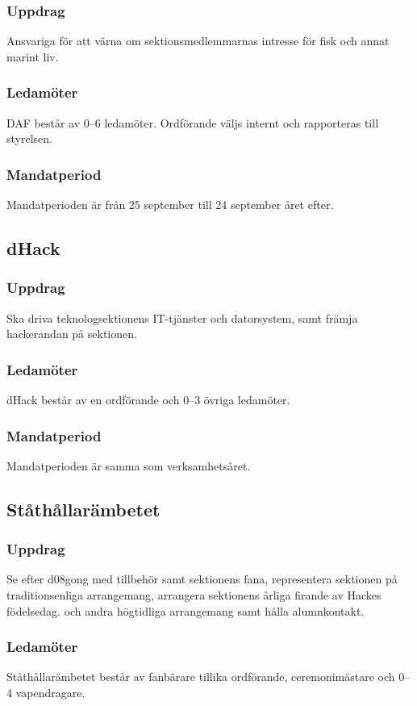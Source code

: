 \subsubsection{Uppdrag}
Ansvariga för att värna om sektionsmedlemmarnas intresse för fisk och
annat marint liv.
\subsubsection{Ledamöter}
DAF består av 0--6 ledamöter. Ordförande väljs internt och rapporteras till styrelsen.
\subsubsection{Mandatperiod}
Mandatperioden är från 25 september till 24 september året efter.

\subsection{dHack}
\subsubsection{Uppdrag}
Ska driva teknologsektionens IT-tjänster och datorsystem, samt
främja hackerandan på sektionen.
\subsubsection{Ledamöter}
dHack består av en ordförande och 0--3 övriga ledamöter.
\subsubsection{Mandatperiod}
Mandatperioden är samma som verksamhetsåret.

\subsection{Ståthållarämbetet}
\subsubsection{Uppdrag}
Se efter d08gong med tillbehör samt sektionens fana, representera sektionen på traditionsenliga arrangemang, arrangera sektionens årliga firande av Hackes födelsedag.
och andra högtidliga arrangemang samt hålla alumnkontakt.
\subsubsection{Ledamöter}
  Ståthållarämbetet består av fanbärare tillika ordförande, ceremonimästare och 0--4 vapendragare.
